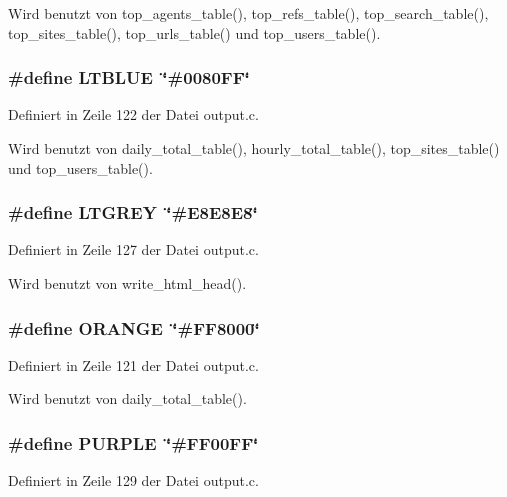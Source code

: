 Wird benutzt von top\_\-agents\_\-table(), top\_\-refs\_\-table(), top\_\-search\_\-table(), top\_\-sites\_\-table(), top\_\-urls\_\-table() und top\_\-users\_\-table().
\subsubsection{\setlength{\rightskip}{0pt plus 5cm}\#define LTBLUE~\char`\"{}\#0080FF\char`\"{}}\label{output_8c_1a13e2f5e41385c6b4ce64b8b683e5d2}




Definiert in Zeile 122 der Datei output.c.

Wird benutzt von daily\_\-total\_\-table(), hourly\_\-total\_\-table(), top\_\-sites\_\-table() und top\_\-users\_\-table().
\subsubsection{\setlength{\rightskip}{0pt plus 5cm}\#define LTGREY~\char`\"{}\#E8E8E8\char`\"{}}\label{output_8c_0ffe2221c8690dc80b5f9553474dd096}




Definiert in Zeile 127 der Datei output.c.

Wird benutzt von write\_\-html\_\-head().
\subsubsection{\setlength{\rightskip}{0pt plus 5cm}\#define ORANGE~\char`\"{}\#FF8000\char`\"{}}\label{output_8c_c5b6e19bf06822021f35602c59658de3}




Definiert in Zeile 121 der Datei output.c.

Wird benutzt von daily\_\-total\_\-table().
\subsubsection{\setlength{\rightskip}{0pt plus 5cm}\#define PURPLE~\char`\"{}\#FF00FF\char`\"{}}\label{output_8c_0bb0b009e7a7390473ace4d98bd843c0}




Definiert in Zeile 129 der Datei output.c.
